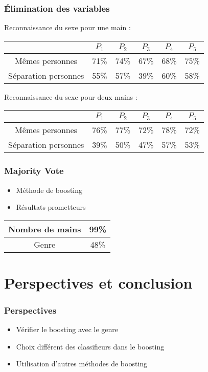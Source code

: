 \documentclass{beamer}
\begin{document}
\begin{frame}
	\frametitle{Élimination des variables}
Reconnaissance du sexe pour une main :
	\begin{tabular}{|*{6}{c|}}
	\hline
	 & $P_1$ & $P_2$ & $P_3$ & $P_4$ & $P_5$ \\
	\hline
	Mêmes personnes & 71\% & 74\% & 67\% & 68\% & 75\% \\
	\hline
	Séparation personnes & 55\% & 57\% & 39\% & 60\% & 58\% \\
	\hline
	\end{tabular}

\bigskip
Reconnaissance du sexe pour deux mains :
	\begin{tabular}{|*{6}{c|}}
	\hline
	 & $P_1$ & $P_2$ & $P_3$ & $P_4$ & $P_5$ \\
	\hline
	Mêmes personnes & 76\% & 77\% & 72\% & 78\% & 72\% \\
	\hline
	Séparation personnes & 39\% & 50\% & 47\% & 57\% & 53\% \\
	\hline
	\end{tabular}
\end{frame}

\begin{frame}
	\frametitle{Majority Vote}
	\begin{itemize}
		\item Méthode de boosting
		\item Résultats prometteurs
	\end{itemize}
	\begin{center}\begin{tabular}{|c|c|}
	\hline
	Nombre de mains & 99\% \\
	\hline
	Genre & 48\% \\
	\hline
	\end{tabular}\end{center}
\end{frame}

\section[Conclusion]{Perspectives et conclusion}
\begin{frame}
	\frametitle{Perspectives}
	\begin{itemize}
		\item Vérifier le boosting avec le genre
		\item Choix différent des classifieurs dans le boosting %
		\item Utilisation d'autres méthodes de boosting
	\end{itemize}
\end{frame}
\end{document}
